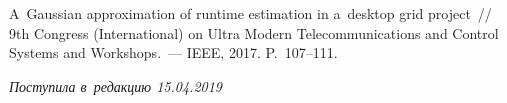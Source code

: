 \begin{multicols}{2}
{{\begin{thebibliography}{99}
A~Gaussian approximation of runtime estimation in a~desktop grid project~// 
9th  Congress (International) on Ultra Modern Telecommunications and Control Systems 
and Workshops.~--- IEEE, 2017. P.~107--111.

\end{thebibliography}
} }

\end{multicols}

 \label{end\stat}

 \vspace*{-9pt}

\hfill{\small\textit{Поступила в~редакцию 15.04.2019}}


\renewcommand{\figurename}{\protect\bf Рис.}
\renewcommand{\tablename}{\protect\bf Таблица}